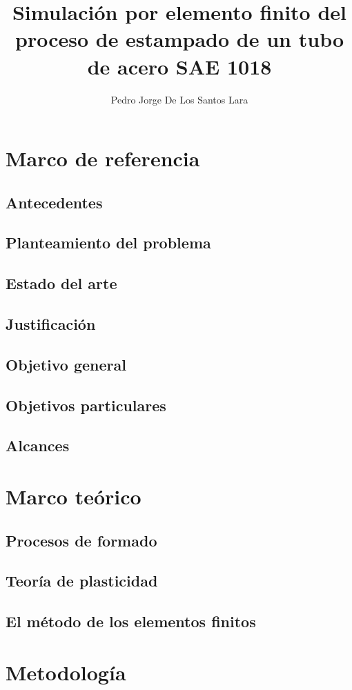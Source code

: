 \documentclass[12pt,letterpaper]{book}
\author{Pedro Jorge De Los Santos Lara}
\title{Simulación por elemento finito del proceso de estampado de un tubo de acero SAE 1018}
\begin{document}
\maketitle
\tableofcontents


\chapter{Marco de referencia}
\section{Antecedentes}
\section{Planteamiento del problema}
\section{Estado del arte}
\section{Justificación}
\section{Objetivo general}
\section{Objetivos particulares}
\section{Alcances}


\chapter{Marco teórico}
\section{Procesos de formado}
\section{Teoría de plasticidad}
\section{El método de los elementos finitos}


\chapter{Metodología}
\end{document}
